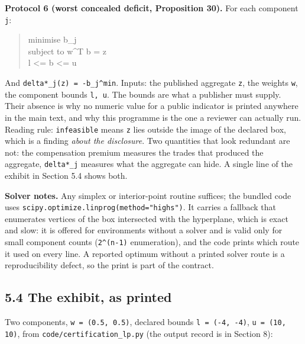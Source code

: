 \documentclass[11pt]{article}
\begin{document}
\textbf{Protocol 6 (worst concealed deficit, Proposition 30).} For each component \texttt{j}:

\begin{quote}\ttfamily\footnotesize\raggedright\setlength{\parskip}{0pt}
minimise   b\_j\\
subject to w\textasciicircum{}T b = z\\
           l <= b <= u
\end{quote}

And \texttt{delta*\_j(z) \allowbreak{}= -\allowbreak{}b\_j\textasciicircum{}min}. Inputs: the published aggregate \texttt{z}, the weights \texttt{w}, the component bounds \texttt{l, u}. The bounds are what a publisher must supply. Their absence is why no numeric value for a public indicator is printed anywhere in the main text, and why this programme is the one a reviewer can actually run. Reading rule: \texttt{infeasible} means \texttt{z} lies outside the image of the declared box, which is a finding \emph{about the disclosure}. Two quantities that look redundant are not: the compensation premium measures the trades that produced the aggregate, \texttt{delta*\_j} measures what the aggregate can hide. A single line of the exhibit in Section 5.4 shows both.

\textbf{Solver notes.} Any simplex or interior-point routine suffices; the bundled code uses \texttt{scipy.\allowbreak{}optimize.\allowbreak{}linprog(meth\allowbreak{}od="highs")}. It carries a fallback that enumerates vertices of the box intersected with the hyperplane, which is exact and slow: it is offered for environments without a solver and is valid only for small component counts (\texttt{2\textasciicircum{}(n-\allowbreak{}1)} enumeration), and the code prints which route it used on every line. A reported optimum without a printed solver route is a reproducibility defect, so the print is part of the contract.

\subsection*{5.4 The exhibit, as printed}\label{54-the-exhibit-as-printed}

Two components, \texttt{w = (0.\allowbreak{}5, 0.\allowbreak{}5)}, declared bounds \texttt{l = (-\allowbreak{}4, -\allowbreak{}4)}, \texttt{u = (10, 10)}, from \texttt{code/\allowbreak{}certificatio\allowbreak{}n\_lp.\allowbreak{}py} (the output record is in Section 8):
\end{document}
